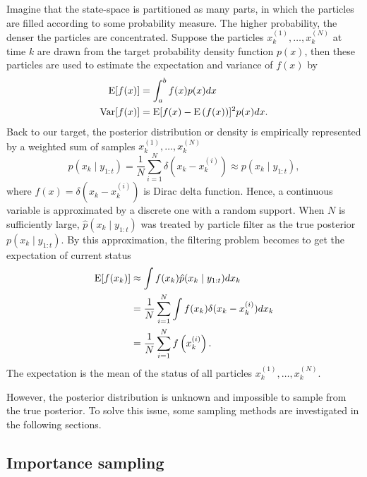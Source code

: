Imagine that the state-space is partitioned as many parts, in which the particles are filled according to some probability measure. The higher probability, the denser the particles are concentrated. Suppose the particles $x_k^{(1)}, \ldots, x_k^{(N)}$ at time $k$ are drawn from the target probability density function $p(x)$, then these particles are used to estimate the expectation and variance of $f(x)$ by
\begin{align*}
\mathrm{E}\lbrack f(x) \rbrack &= \int_a^bf(x)p(x)dx\\
\mathrm{Var}\lbrack f(x)\rbrack &= \mathrm{E}\lbrack f(x)-\mathrm{E}\left( f(x)\right) \rbrack^2p(x)dx.
\end{align*}
Back to our target, the posterior distribution or density is empirically represented by a weighted sum of samples $x_k^{(1)}, \ldots, x_k^{(N)}$  
\begin{equation}\label{rawParticleFilter}
\hat{p}(x_k\mid y_{1:t})=\frac{1}{N}\sum_{i=1}^N\delta \left(x_k-x_k^{(i)}\right)\approx p(x_k\mid y_{1:t}),
\end{equation}
where $f(x)=\delta (x_k-x_k^{(i)})$ is Dirac delta function. Hence, a continuous variable is approximated by a discrete one with a random support. When $N$ is sufficiently large, $\hat{p}(x_k\mid y_{1:t})$ was treated by particle filter as the true posterior $p(x_k\mid y_{1:t})$. By this approximation, the filtering problem becomes to get the expectation of current status 
\begin{align*}
\mathrm{E}\lbrack f(x_k)\rbrack &\approx \int f(x_k)\hat{p}(x_k\mid y_{1:t})dx_k \\
 & =\frac{1}{N} \sum_{i=1}^N\int f(x_k) \delta (x_k-x_k^{(i)}) dx_k\\
 & = \frac{1}{N}\sum_{i=1}^Nf\left(x_k^{(i)}\right).
\end{align*}
The expectation is the mean of the status of all particles $x_k^{(1)}, \ldots, x_k^{(N)}$.  

However, the posterior distribution is unknown and impossible to sample from the true posterior. To solve this issue, some sampling methods are investigated in the following sections.


\subsection{Importance sampling}


